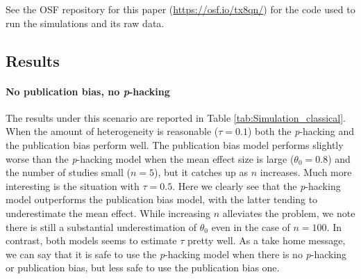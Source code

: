 \documentclass{article}
\theoremstyle{plain}
\theoremstyle{definition}
\begin{document}
See the OSF repository for this paper (\url{https://osf.io/tx8qn/}) for the code used to run the simulations and its raw data.

\subsection{Results}
\paragraph{No publication bias, no \textit{p}-hacking} The results under this scenario are reported in Table \ref{tab:Simulation_classical}. When the amount of heterogeneity is reasonable ($\tau = 0.1$) both the \textit{p}-hacking and the publication bias perform well. The publication bias model performs slightly worse than the \textit{p}-hacking model when the mean effect size is large ($\theta_0 = 0.8$) and the number of studies small ($n=5$), but it catches up as $n$ increases. Much more interesting is the situation with $\tau = 0.5$. Here we clearly see that the \textit{p}-hacking model outperforms the publication bias model, with the latter tending to underestimate the mean effect. While increasing $n$ alleviates the problem, we note there is still a substantial underestimation of $\theta_0$ even in the case of $n = 100$. In contrast, both models seems to estimate $\tau$ pretty well. As a take home message, we can say that it is safe to use the \textit{p}-hacking model when there is no \textit{p}-hacking or publication bias, but less safe to use the publication bias one.
\end{document}
